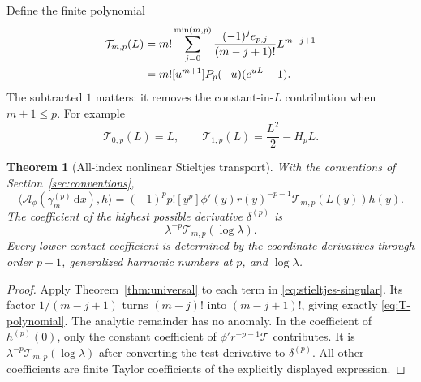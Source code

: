 \documentclass[11pt]{article}
\newtheorem{theorem}{Theorem}[section]
\theoremstyle{definition}\newtheorem{definition}[theorem]{Definition}
\theoremstyle{remark}\newtheorem{remark}[theorem]{Remark}
\newcommand{\dd}{\,\mathrm d}
\newcommand{\Ac}{\mathcal A}
\newcommand{\Tc}{\mathcal T}
\begin{document}
Define the finite polynomial
\begin{align}\label{eq:T-polynomial}
\Tc_{m,p}(L)
&=m!\sum_{j=0}^{\min(m,p)}
\frac{(-1)^je_{p,j}}{(m-j+1)!}L^{m-j+1}\\
&=m![u^{m+1}]P_p(-u)(e^{uL}-1).\notag
\end{align}
The subtracted $1$ matters: it removes the constant-in-$L$ contribution when $m+1\le p$. For example
\begin{equation}\label{eq:T-first}
\Tc_{0,p}(L)=L,\qquad
\Tc_{1,p}(L)=\frac{L^2}{2}-H_pL.
\end{equation}

\begin{theorem}[All-index nonlinear Stieltjes transport]\label{thm:stieltjes}
With the conventions of Section~\ref{sec:conventions},
\begin{equation}\label{eq:stieltjes-transport}
\boxed{\displaystyle
\big\langle\Ac_\phi(\gamma_m^{(p)}\dd x),h\big\rangle
=(-1)^pp![y^p] \phi'(y)r(y)^{-p-1}
\Tc_{m,p}(L(y))h(y).}
\end{equation}
The coefficient of the highest possible derivative $\delta^{(p)}$ is
\begin{equation}\label{eq:highest-delta}
\lambda^{-p}\Tc_{m,p}(\log\lambda).
\end{equation}
Every lower contact coefficient is determined by the coordinate derivatives through order $p+1$, generalized harmonic numbers at $p$, and $\log\lambda$.
\end{theorem}
\begin{proof}
Apply Theorem~\ref{thm:universal} to each term in \eqref{eq:stieltjes-singular}. Its factor $1/(m-j+1)$ turns $(m-j)!$ into $(m-j+1)!$, giving exactly \eqref{eq:T-polynomial}. The analytic remainder has no anomaly. In the coefficient of $h^{(p)}(0)$, only the constant coefficient of $\phi'r^{-p-1}\Tc$ contributes. It is $\lambda^{-p}\Tc_{m,p}(\log\lambda)$ after converting the test derivative to $\delta^{(p)}$. All other coefficients are finite Taylor coefficients of the explicitly displayed expression.
\end{proof}
\end{document}
